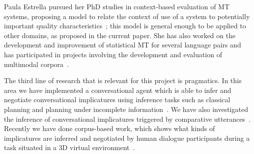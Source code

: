 
Paula Estrella pursued her PhD studies in context-based evaluation of MT
systems, proposing a model to relate the context of use of a system to
potentially important quality characteristics~\cite{estr:impr08,estr:femt09};
this model is general enough to be applied to other domains, as proposed in the
current paper. She has also
worked on the development and improvement of
statistical MT for several language pairs and has participated in projects
involving
the development and evaluation of  multimodal corpora~\cite{multieval}.

The third line of research that is relevant for this project is pragmatics. In
this area we have implemented a conversational agent which is able to infer and
negotiate conversational implicatures using inference tasks such as
classical planning and planning under incomplete information~\cite{benotti09b}.
We have also investigated the inference of conversational implicatures triggered
by comparative utterances~\cite{benotti09a}. Recently we have done corpus-based
work, which shows what kinds of implicatures are inferred and negotiated by
human dialogue participants during a task situated in a 3D
virtual environment~\cite{benotti09c}. 





